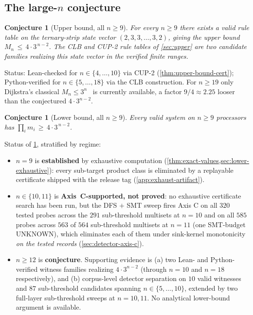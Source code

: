 \documentclass[11pt,a4paper]{article}
\theoremstyle{plain}
\newtheorem{conjecture}[theorem]{Conjecture}
\theoremstyle{definition}
\newcommand{\Mn}{M_n}
\begin{document}
\subsection{The large-$n$ conjecture}\label{sec:main-conj}

\begin{conjecture}[Upper bound, all $n \ge 9$]\label{conj:ub-allN}
For every $n \ge 9$ there exists a valid rule table on the
ternary-strip state vector $(2, 3, 3, \ldots, 3, 2)$, giving the upper
bound $\Mn \,\le\, 4 \cdot 3^{\,n-2}$.  The CLB and CUP-2 rule tables of
\cref{sec:upper} are two candidate families realizing this state vector
in the verified finite ranges.
\end{conjecture}

Status: Lean-checked for $n \in \{4, \ldots, 10\}$ via CUP-2
(\cref{thm:upper-bound-cert}); Python-verified for
$n \in \{5, \ldots, 18\}$ via the CLB construction.  For $n \ge 19$
only Dijkstra's classical
$\Mn \le 3^n$~\cite{Dijkstra1974} is currently available, a
factor $9/4 \approx 2.25$ looser than the conjectured
$4 \cdot 3^{n-2}$.

\begin{conjecture}[Lower bound, all $n \ge 9$]\label{conj:lb-allN}
Every valid system on $n \ge 9$ processors has
$\prod_i m_i \,\ge\, 4 \cdot 3^{\,n-2}$.
\end{conjecture}

Status of \cref{conj:lb-allN}, stratified by regime:

\begin{itemize}[leftmargin=*]
\item $n = 9$ is \textbf{established} by exhaustive computation
(\cref{thm:exact-values,sec:lower-exhaustive}): every sub-target
product class is eliminated by a replayable certificate shipped
with the release tag (\cref{app:exhaust-artifact}).
\item $n \in \{10, 11\}$ is \textbf{Axis~C-supported, not proved}:
no exhaustive certificate search has been run, but the DFS $+$ SMT
sweep fires Axis C on all $320$ tested probes across the $291$
sub-threshold multisets at $n = 10$ and on all $585$ probes
across $563$ of $564$ sub-threshold multisets at $n = 11$ (one
SMT-budget UNKNOWN), which eliminates each of them under
sink-kernel monotonicity \emph{on the tested records}
(\cref{sec:detector-axis-c}).
\item $n \ge 12$ is \textbf{conjecture}.  Supporting evidence is
(a) two Lean- and Python-verified witness families realizing
$4 \cdot 3^{n-2}$ (through $n = 10$ and $n = 18$ respectively), and
(b) corpus-level detector separation on $10$ valid witnesses and
$87$ sub-threshold candidates spanning $n \in \{5, \ldots, 10\}$,
extended by two full-layer sub-threshold sweeps at $n = 10, 11$.
No analytical lower-bound argument is available.
\end{itemize}
\end{document}
